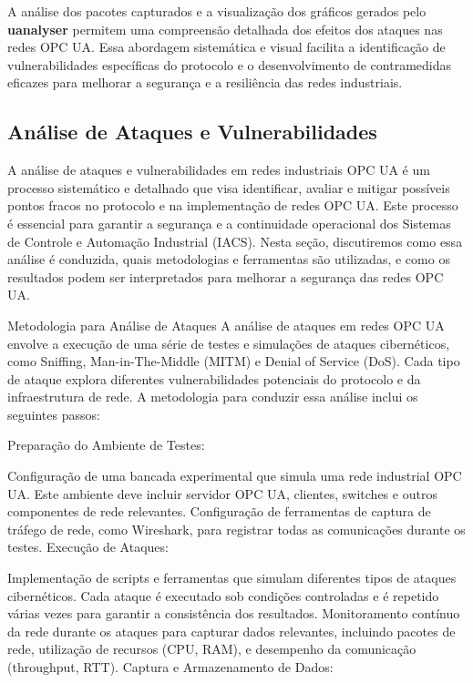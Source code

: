     A análise dos pacotes capturados e a visualização dos gráficos gerados pelo \textbf{uanalyser} permitem uma compreensão detalhada dos efeitos dos ataques nas redes OPC UA. Essa abordagem sistemática e visual facilita a identificação de vulnerabilidades específicas do protocolo e o desenvolvimento de contramedidas eficazes para melhorar a segurança e a resiliência das redes industriais.

    \subsection{Análise de Ataques e Vulnerabilidades}

    

    {\color{red}
    A análise de ataques e vulnerabilidades em redes industriais OPC UA é um processo sistemático e detalhado que visa identificar, avaliar e mitigar possíveis pontos fracos no protocolo e na implementação de redes OPC UA. Este processo é essencial para garantir a segurança e a continuidade operacional dos Sistemas de Controle e Automação Industrial (IACS). Nesta seção, discutiremos como essa análise é conduzida, quais metodologias e ferramentas são utilizadas, e como os resultados podem ser interpretados para melhorar a segurança das redes OPC UA.

    Metodologia para Análise de Ataques
    A análise de ataques em redes OPC UA envolve a execução de uma série de testes e simulações de ataques cibernéticos, como Sniffing, Man-in-The-Middle (MITM) e Denial of Service (DoS). Cada tipo de ataque explora diferentes vulnerabilidades potenciais do protocolo e da infraestrutura de rede. A metodologia para conduzir essa análise inclui os seguintes passos:

    Preparação do Ambiente de Testes:

    Configuração de uma bancada experimental que simula uma rede industrial OPC UA. Este ambiente deve incluir servidor OPC UA, clientes, switches e outros componentes de rede relevantes.
    Configuração de ferramentas de captura de tráfego de rede, como Wireshark, para registrar todas as comunicações durante os testes.
    Execução de Ataques:

    Implementação de scripts e ferramentas que simulam diferentes tipos de ataques cibernéticos. Cada ataque é executado sob condições controladas e é repetido várias vezes para garantir a consistência dos resultados.
    Monitoramento contínuo da rede durante os ataques para capturar dados relevantes, incluindo pacotes de rede, utilização de recursos (CPU, RAM), e desempenho da comunicação (throughput, RTT).
    Captura e Armazenamento de Dados:

}
